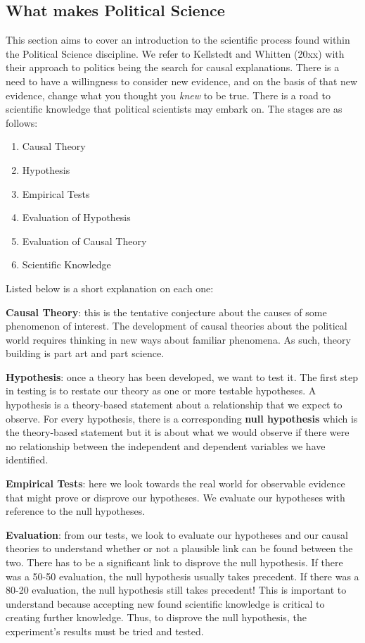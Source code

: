 \documentclass[12pt, letterpaper]{article}
\begin{document}
{\subsection{What makes Political Science}
This section aims to cover an introduction to the scientific process found within the Political Science discipline. We refer to Kellstedt and Whitten (20xx) with their approach to politics being the search for causal explanations. There is a need to have a willingness to consider new evidence, and on the basis of that new evidence, change what you thought you \textit{knew} to be true. There is a road to scientific knowledge that political scientists may embark on. The stages are as follows:
\begin{enumerate}
	\item Causal Theory
	\item Hypothesis
	\item Empirical Tests
	\item Evaluation of Hypothesis
	\item Evaluation of Causal Theory
	\item Scientific Knowledge
\end{enumerate}
Listed below is a short explanation on each one:

\vspace{10pt}
\noindent \textbf{Causal Theory}: this is the tentative conjecture about the causes of some phenomenon of interest. The development of causal theories about the political world requires thinking in new ways about familiar phenomena. As such, theory building is part art and part science.

\vspace{10pt}
\noindent \textbf{Hypothesis}: once a theory has been developed, we want to test it. The first step in testing is to restate our theory as one or more testable hypotheses. A hypothesis is a theory-based statement about a relationship that we expect to observe. For every hypothesis, there is a corresponding \textbf{null hypothesis} which is the theory-based statement but it is about what we would observe if there were no relationship between the independent and dependent variables we have identified.

\vspace{10pt}
\noindent \textbf{Empirical Tests}: here we look towards the real world for observable evidence that might prove or disprove our hypotheses. We evaluate our hypotheses with reference to the null hypotheses.

\vspace{10pt}
\noindent \textbf{Evaluation}: from our tests, we look to evaluate our hypotheses and our causal theories to understand whether or not a plausible link can be found between the two. There has to be a significant link to disprove the null hypothesis. If there was a 50-50 evaluation, the null hypothesis usually takes precedent. If there was a 80-20 evaluation, the null hypothesis still takes precedent! This is important to understand because accepting new found scientific knowledge is critical to creating further knowledge. Thus, to disprove the null hypothesis, the experiment's results must be tried and tested.

}
\end{document}
